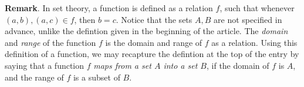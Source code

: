 \documentclass{article}
\begin{document}
\textbf{Remark}.  In set theory, a function is defined as a relation $f$, such that whenever $(a,b),(a,c)\in f$, then $b=c$.  Notice that the sets $A,B$ are not specified in advance, unlike the defintion given in the beginning of the article.  The \emph{domain} and \emph{range} of the function $f$ is the domain and range of $f$ as a relation.  Using this definition of a function, we may recapture the defintion at the top of the entry by saying that a function $f$ \emph{maps from a set $A$ into a set $B$}, if the domain of $f$ is $A$, and the range of $f$ is a subset of $B$.
\end{document}
